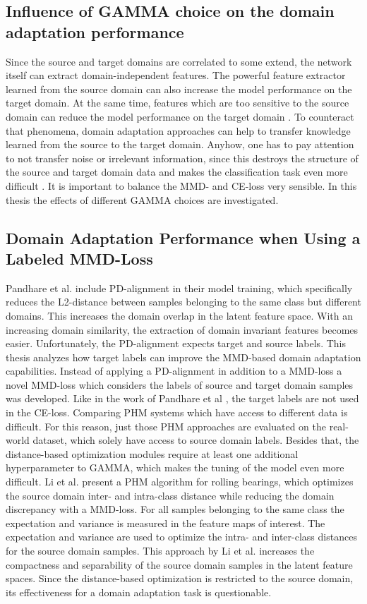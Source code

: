 \subsection{Influence of GAMMA choice on the domain adaptation performance}
Since the source and target domains are correlated to some extend, the network itself can extract domain-independent features. The powerful feature extractor learned from the source domain can also increase the model performance on the target domain. At the same time, features which are too sensitive to the source domain can reduce the model performance on the target domain \cite{li2020}. To counteract that phenomena, domain adaptation approaches can help to transfer knowledge learned from the source to the target domain. Anyhow, one has to pay attention to not transfer noise or irrelevant information, since this destroys the structure of the source and target domain data and makes the classification task even more difficult \cite{li2020}. It is important to balance the MMD- and CE-loss very sensible. In this thesis the effects of different GAMMA choices are investigated.

\subsection{Domain Adaptation Performance when Using a Labeled MMD-Loss}
Pandhare et al. \cite{Pandhare2021} include PD-alignment in their model training, which specifically reduces the L2-distance between samples belonging to the same class but different domains. This increases the domain overlap in the latent feature space. With an increasing domain similarity, the extraction of domain invariant features becomes easier. Unfortunately, the PD-alignment expects target and source labels. This thesis analyzes how target labels can improve the MMD-based domain adaptation capabilities. Instead of applying a PD-alignment in addition to a MMD-loss a novel MMD-loss which considers the labels of source and target domain samples was developed. Like in the work of Pandhare et al \cite{Pandhare2021}, the target labels are not used in the CE-loss. Comparing PHM systems which have access to different data is difficult. For this reason, just those PHM approaches are evaluated on the real-world dataset, which solely have access to source domain labels.  Besides that, the distance-based optimization modules require at least one additional hyperparameter to GAMMA, which makes the tuning of the model even more difficult. Li et al. \cite{Li2018} present a PHM algorithm for rolling bearings, which optimizes the source domain inter- and intra-class distance while reducing the domain discrepancy with a MMD-loss. For all samples belonging to the same class the expectation and variance is measured in the feature maps of interest. The expectation and variance are used to optimize the intra- and inter-class distances for the source domain samples. This approach by Li et al. increases the compactness and separability of the source domain samples in the latent feature spaces. Since the distance-based optimization is restricted to the source domain, its effectiveness for a domain adaptation task is questionable.


